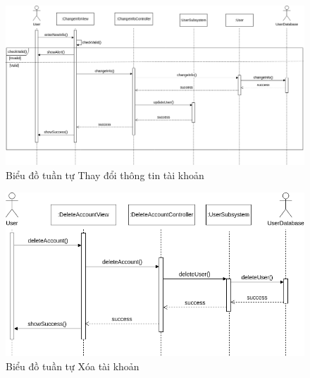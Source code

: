 \begin{figure}[H]
    \centering
    \includegraphics[width=\textwidth]{img3.4/Design_diagram-Thay đổi thông tin.drawio.png} 
    \caption{Biểu đồ tuần tự Thay đổi thông tin tài khoản}
\end{figure}

\begin{figure}[H]
    \centering
    \includegraphics[width=\textwidth]{img3.4/Design_diagram-Xóa tài khoản.drawio.png} 
    \caption{Biểu đồ tuần tự Xóa tài khoản}
\end{figure}

